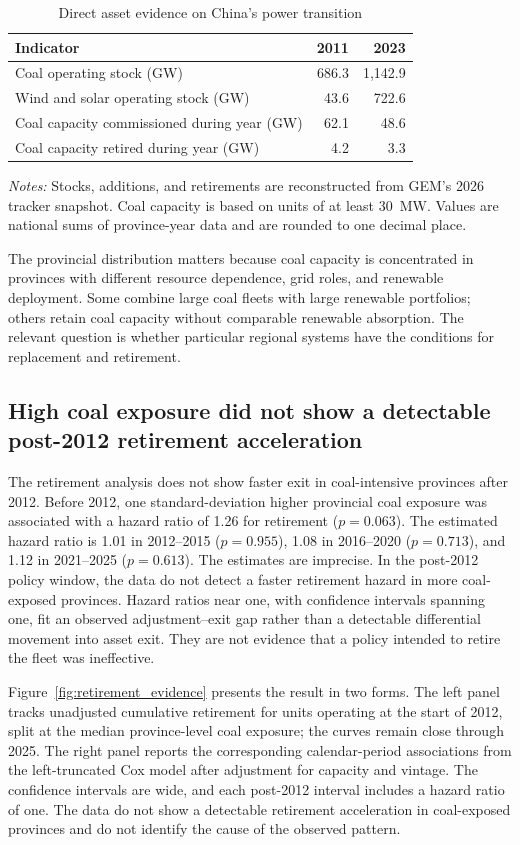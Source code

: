 \documentclass[11pt]{article}
\newcommand{\note}[1]{\begin{minipage}{0.96\textwidth}\footnotesize\textit{Notes:} #1\end{minipage}}
\begin{document}
\begin{table}[H]
\centering
\caption{Direct asset evidence on China's power transition}
\label{tab:assetfacts}
\begin{tabular}{lrr}
\toprule
Indicator & 2011 & 2023 \\
\midrule
Coal operating stock (GW) & 686.3 & 1,142.9 \\
Wind and solar operating stock (GW) & 43.6 & 722.6 \\
Coal capacity commissioned during year (GW) & 62.1 & 48.6 \\
Coal capacity retired during year (GW) & 4.2 & 3.3 \\
\bottomrule
\end{tabular}
\note{Stocks, additions, and retirements are reconstructed from GEM's 2026 tracker snapshot. Coal capacity is based on units of at least 30~MW. Values are national sums of province-year data and are rounded to one decimal place.}
\end{table}

The provincial distribution matters because coal capacity is concentrated in provinces with different resource dependence, grid roles, and renewable deployment. Some combine large coal fleets with large renewable portfolios; others retain coal capacity without comparable renewable absorption. The relevant question is whether particular regional systems have the conditions for replacement and retirement.

\subsection{High coal exposure did not show a detectable post-2012 retirement acceleration}

The retirement analysis does not show faster exit in coal-intensive provinces after 2012. Before 2012, one standard-deviation higher provincial coal exposure was associated with a hazard ratio of 1.26 for retirement ($p=0.063$). The estimated hazard ratio is 1.01 in 2012--2015 ($p=0.955$), 1.08 in 2016--2020 ($p=0.713$), and 1.12 in 2021--2025 ($p=0.613$). The estimates are imprecise. In the post-2012 policy window, the data do not detect a faster retirement hazard in more coal-exposed provinces. Hazard ratios near one, with confidence intervals spanning one, fit an observed adjustment--exit gap rather than a detectable differential movement into asset exit. They are not evidence that a policy intended to retire the fleet was ineffective.

Figure~\ref{fig:retirement_evidence} presents the result in two forms. The left panel tracks unadjusted cumulative retirement for units operating at the start of 2012, split at the median province-level coal exposure; the curves remain close through 2025. The right panel reports the corresponding calendar-period associations from the left-truncated Cox model after adjustment for capacity and vintage. The confidence intervals are wide, and each post-2012 interval includes a hazard ratio of one. The data do not show a detectable retirement acceleration in coal-exposed provinces and do not identify the cause of the observed pattern.
\end{document}
